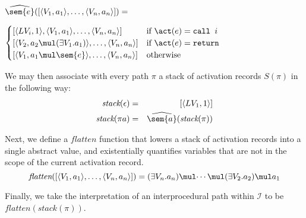   \noindent$\widehat{\sem{e}}([\langle V_1, a_1 \rangle, \ldots, \langle V_n, a_n \rangle]) =$

   \hfill$\begin{cases}
     [\langle LV_i, 1 \rangle,\langle V_1, a_1 \rangle,\ldots,\langle V_n, a_n \rangle] & \text{if } \act(e) = \texttt{call } i\\
     [\langle V_2, a_2 \mul (\exists V_1.a_1) \rangle, \ldots, \langle V_n, a_n \rangle] & \text{if } \act(e) = \texttt{return}\\
     [\langle V_1, a_1 \mul \sem{e} \rangle, \ldots, \langle V_n, a_n \rangle] & \text{otherwise}
   \end{cases}$

   We may then associate with every path $\pi$ a stack of activation records
   $S(\pi)$ in the following way:
   \begin{eqnarray*}
     \textit{stack}(\epsilon) &=& [\langle LV_1, 1 \rangle]\\
     \textit{stack}(\pi a) &=& \widehat{\sem{a}}(\textit{stack}(\pi))
   \end{eqnarray*}

   Next, we define a $\textit{flatten}$ function that lowers a stack of
   activation records into a single abstract value, and existentially
   quantifies variables that are not in the scope of the current activation
   record.
   \[\textit{flatten}([\langle V_1, a_1 \rangle, \ldots, \langle V_n,
     a_n \rangle]) = (\exists V_n. a_n)\mul \dotsi \mul (\exists V_2. a_2)
   \mul a_1\]

   Finally, we take the interpretation of an interprocedural path within
   $\mathscr{I}$ to be $\textit{flatten}(\textit{stack}(\pi))$.


